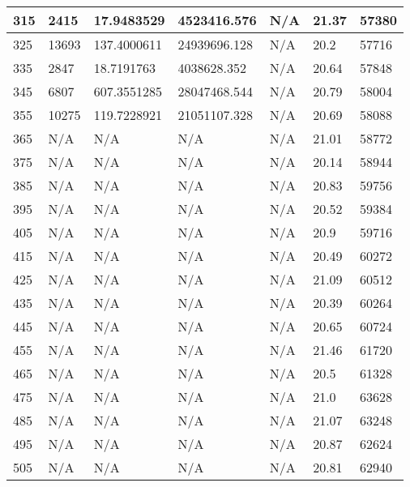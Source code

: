 \begin{tabular}{|l||l|l|l||l|l|l|}
315  & 2415            & 17.9483529     & 4523416.576      & N/A            & 21.37         & 57380           \\ \hline
325  & 13693           & 137.4000611    & 24939696.128     & N/A            & 20.2          & 57716           \\ \hline
335  & 2847            & 18.7191763     & 4038628.352      & N/A            & 20.64         & 57848           \\ \hline
345  & 6807            & 607.3551285    & 28047468.544     & N/A            & 20.79         & 58004           \\ \hline
355  & 10275           & 119.7228921    & 21051107.328     & N/A            & 20.69         & 58088           \\ \hline
365  & N/A             & N/A            & N/A              & N/A            & 21.01         & 58772           \\ \hline
375  & N/A             & N/A            & N/A              & N/A            & 20.14         & 58944           \\ \hline
385  & N/A             & N/A            & N/A              & N/A            & 20.83         & 59756           \\ \hline
395  & N/A             & N/A            & N/A              & N/A            & 20.52         & 59384           \\ \hline
405  & N/A             & N/A            & N/A              & N/A            & 20.9          & 59716           \\ \hline
415  & N/A             & N/A            & N/A              & N/A            & 20.49         & 60272           \\ \hline
425  & N/A             & N/A            & N/A              & N/A            & 21.09         & 60512           \\ \hline
435  & N/A             & N/A            & N/A              & N/A            & 20.39         & 60264           \\ \hline
445  & N/A             & N/A            & N/A              & N/A            & 20.65         & 60724           \\ \hline
455  & N/A             & N/A            & N/A              & N/A            & 21.46         & 61720           \\ \hline
465  & N/A             & N/A            & N/A              & N/A            & 20.5          & 61328           \\ \hline
475  & N/A             & N/A            & N/A              & N/A            & 21.0          & 63628           \\ \hline
485  & N/A             & N/A            & N/A              & N/A            & 21.07         & 63248           \\ \hline
495  & N/A             & N/A            & N/A              & N/A            & 20.87         & 62624           \\ \hline
505  & N/A             & N/A            & N/A              & N/A            & 20.81         & 62940           \\ \hline
\end{tabular}